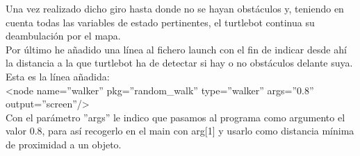Una vez realizado dicho giro hasta donde no se hayan obstáculos y, teniendo en cuenta todas las variables de estado pertinentes, el turtlebot continua su deambulación por el mapa.\\
Por último he añadido una línea al fichero launch con el fin de indicar desde ahí la distancia a la que turtlebot ha de detectar si hay o no obstáculos delante suya. Esta es la línea añadida: \\
<node name=''walker'' pkg=''random\_walk'' type=''walker'' args=''0.8'' output=''screen''/> \\
Con el parámetro ''args'' le indico que pasamos al programa como argumento el valor 0.8, para así recogerlo en el main con arg[1] y usarlo como distancia mínima de proximidad a un objeto.


\newpage






